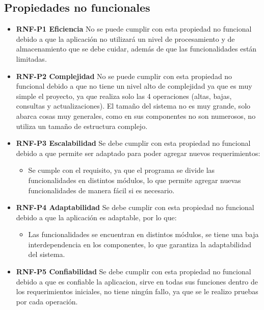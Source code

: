 \subsection{Propiedades no funcionales }

\begin{itemize}
	\item \textbf{RNF-P1 Eficiencia} No se puede cumplir con esta propiedad no funcional debido a que la aplicación no utilizará un nivel de procesamiento y de almacenamiento que se debe cuidar, además de que las funcionalidades están limitadas.
	\item \textbf{RNF-P2 Complejidad} No se puede cumplir con esta propiedad no funcional debido a que no tiene un nivel alto de complejidad ya que es muy simple el proyecto, ya que realiza solo las 4 operaciones (altas, bajas, consultas y actualizaciones). El tamaño del sistema no es muy grande, solo abarca cosas muy generales, como en sus componentes no son numerosos, no utiliza un tamaño de estructura complejo.
	\item \textbf{RNF-P3 Escalabilidad} 
	Se debe cumplir con esta propiedad no funcional debido a que permite ser adaptado para poder agregar nuevos requerimientos:
	\begin{itemize}
		\item Se cumple con el requisito, ya que el programa se divide las funcionalidades en distintos módulos, lo que permite agregar nuevas funcionalidades de manera fácil si es necesario.
	\end{itemize}
	\item \textbf{RNF-P4 Adaptabilidad} Se debe cumplir con esta propiedad no funcional debido a que la aplicación es adaptable, por lo que:
	\begin{itemize}
		\item Las funcionalidades se encuentran en distintos módulos, se tiene una baja interdependencia en los componentes, lo que garantiza la adaptabilidad del sistema.
	\end{itemize}
	
	\item \textbf{RNF-P5 Confiabilidad} Se debe cumplir con esta propiedad no funcional debido a que es confiable la aplicacion, sirve en todas sus funciones dentro de los requerimientos iniciales, no tiene ningún fallo, ya que se le realizo pruebas por cada operación.
\end{itemize}	
